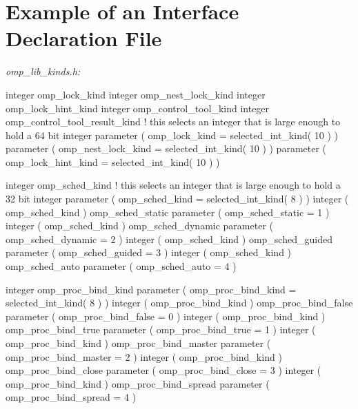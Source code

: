 \pagebreak
{\section{Example of an Interface Declaration  File}}
\label{sec:Example of an Interface Declaration include File}
\emph{omp\_lib\_kinds.h:}
{\small \begin{codepar}

     integer omp\_lock\_kind
     integer omp\_nest\_lock\_kind
     integer omp\_lock\_hint\_kind
     integer omp\_control\_tool\_kind
     integer omp\_control\_tool\_result\_kind
! this selects an integer that is large enough to hold a 64 bit integer
     parameter ( omp\_lock\_kind = selected\_int\_kind( 10 ) )
     parameter ( omp\_nest\_lock\_kind = selected\_int\_kind( 10 ) )
     parameter ( omp\_lock\_hint\_kind = selected\_int\_kind( 10 ) )
     
     integer omp\_sched\_kind
! this selects an integer that is large enough to hold a 32 bit integer
     parameter ( omp\_sched\_kind = selected\_int\_kind( 8 ) )
     integer ( omp\_sched\_kind ) omp\_sched\_static
     parameter ( omp\_sched\_static = 1 )
     integer ( omp\_sched\_kind ) omp\_sched\_dynamic
     parameter ( omp\_sched\_dynamic = 2 )
     integer ( omp\_sched\_kind ) omp\_sched\_guided
     parameter ( omp\_sched\_guided = 3 )
     integer ( omp\_sched\_kind ) omp\_sched\_auto
     parameter ( omp\_sched\_auto = 4 )
     
     integer omp\_proc\_bind\_kind
     parameter ( omp\_proc\_bind\_kind = selected\_int\_kind( 8 ) )
     integer ( omp\_proc\_bind\_kind ) omp\_proc\_bind\_false
     parameter ( omp\_proc\_bind\_false = 0 )
     integer ( omp\_proc\_bind\_kind ) omp\_proc\_bind\_true
     parameter ( omp\_proc\_bind\_true = 1 )
     integer ( omp\_proc\_bind\_kind ) omp\_proc\_bind\_master
     parameter ( omp\_proc\_bind\_master = 2 )
     integer ( omp\_proc\_bind\_kind ) omp\_proc\_bind\_close
     parameter ( omp\_proc\_bind\_close = 3 )
     integer ( omp\_proc\_bind\_kind ) omp\_proc\_bind\_spread
     parameter ( omp\_proc\_bind\_spread = 4 )


\end{codepar}}
